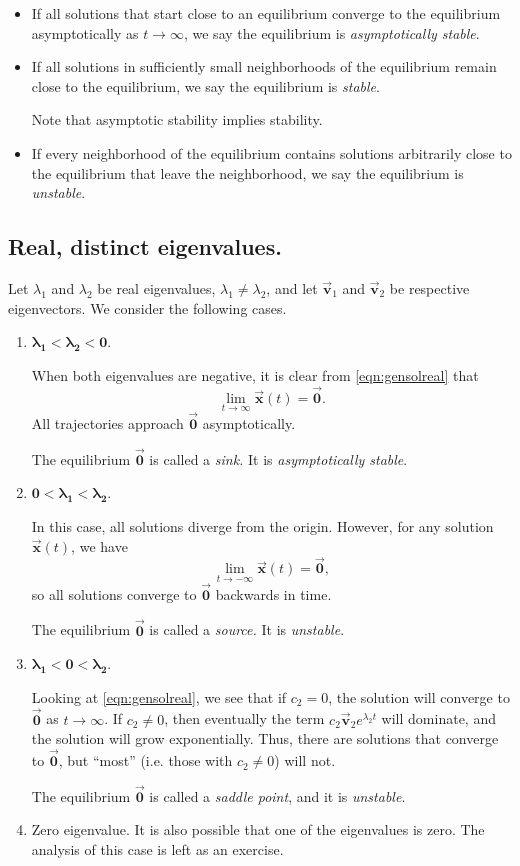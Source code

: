 \documentclass[reqno]{immbook}
\newcommand{\BV}{\vec{\textbf{v}}}
\newcommand{\BX}{\vec{\textbf{x}}}
\newcommand{\BZero}{\vec{\textbf{0}}}  %
\numberwithin{equation}{chapter}
\numberwithin{question}{section}
\numberwithin{theorem}{chapter}
\numberwithin{figure}{chapter}
\theoremstyle{definition}
\begin{document}
\begin{itemize}
\item If all solutions that start close to an equilibrium converge
to the equilibrium asymptotically as $t\rightarrow\infty$, we
say the equilibrium is
\emph{asymptotically stable}.
\item If all solutions in sufficiently small neighborhoods
of the equilibrium remain close to the equilibrium, we say
the equilibrium is \emph{stable}.

Note that asymptotic stability implies stability.
\item If every neighborhood of the equilibrium contains solutions
arbitrarily close to the equilibrium that leave the neighborhood, we say the equilibrium is \emph{unstable}. 
\end{itemize}

\subsection*{Real, distinct eigenvalues.}
Let $\lambda_1$ and $\lambda_2$ be real eigenvalues,
$\lambda_1\ne\lambda_2$, and let $\BV_1$ and $\BV_2$
be respective eigenvectors.  We consider the following
cases.
\begin{enumerate}
\item $\pmb{\lambda_1 < \lambda_2 < 0}$.

When both eigenvalues are negative, it is clear from
\eqref{eqn:gensolreal}
that
\[
  \lim_{t\rightarrow\infty}\BX(t) = \BZero.
\]
All trajectories approach $\BZero$ asymptotically.

The equilibrium $\BZero$ is called a \emph{sink.}
It is \emph{asymptotically stable}.

\item $\pmb{0 < \lambda_1 < \lambda _2}$.

In this case, all solutions diverge from the origin.
However, for any solution $\BX(t)$, we have
\[
  \lim_{t\rightarrow -\infty}\BX(t) = \BZero,
\]
so all solutions 
converge to $\BZero$ backwards in time.

The equilibrium $\BZero$ is called a \emph{source.}
It is \emph{unstable}.

\item $\pmb{\lambda_1 < 0 < \lambda_2}$.

Looking at \eqref{eqn:gensolreal}, we see that if $c_2=0$, the solution
will converge to $\BZero$ as $t\rightarrow\infty$.
If $c_2\ne 0$, then eventually the term $c_2\BV_2e^{\lambda_2 t}$ will
dominate, and the solution will grow exponentially.
Thus, there are solutions that converge to $\BZero$, but ``most''
(i.e. those with $c_2\ne 0$) will not.

The equilibrium $\BZero$ is called a \emph{saddle point}, 
and it is \emph{unstable}.
\item Zero eigenvalue.  It is also possible that
one of the eigenvalues is zero.  The analysis
of this case is left as an exercise.
\end{enumerate}
\end{document}
